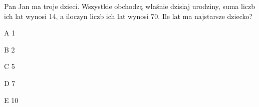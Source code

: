 \begin{tresc}
Pan Jan ma troje dzieci. Wszystkie obchodzą właśnie dzisiaj urodziny, suma liczb ich lat wynosi 14, a iloczyn liczb ich lat wynosi 70. Ile lat ma najstarsze dziecko?
\end{tresc}
\begin{wariant}{A} 1 \end{wariant}
\begin{wariant}{B} 2 \end{wariant}
\begin{wariant}{C} 5 \end{wariant}
\begin{wariant}{D} 7 \end{wariant}
\begin{wariant}{E} 10 \end{wariant}
